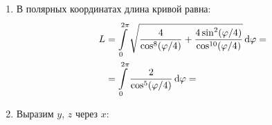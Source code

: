 \documentclass{report}
\begin{document}
\sol
\begin{enumerate}
\item В полярных координатах длина кривой равна:
    \begin{align*}
        L &= \int\limits_{0}^{2\pi}\sqrt{\frac{4}{\cos^8(\varphi/4)} + \dfrac{4\sin^2(\varphi/4)}{\cos^{10}(\varphi/4)}}\dl \varphi =\\
        &= \int\limits_{0}^{2\pi}\dfrac{2}{\cos^5(\varphi/4)}\dl \varphi = 
    \end{align*}
\item Выразим $y$, $z$ через $x$:
\begin{align*}

\end{align*}
\end{enumerate}
\end{document}
